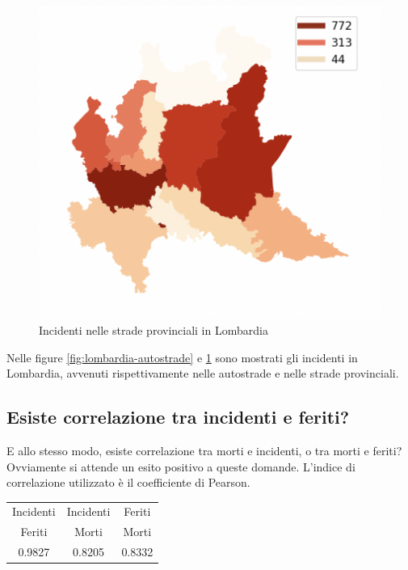 \documentclass[a4paper]{report}
\begin{document}
\begin{figure}
    \includegraphics[width=\linewidth]{../src/provincia/lombardia_strade_prov.png}
    \caption{Incidenti nelle strade provinciali in Lombardia}
    \label{fig:lombardia-strade-prov}
\end{figure}

Nelle figure \ref{fig:lombardia-autostrade} e \ref{fig:lombardia-strade-prov} sono mostrati gli incidenti in Lombardia, 
avvenuti rispettivamente nelle autostrade e nelle strade provinciali.



\subsection{Esiste correlazione tra incidenti e feriti?}

E allo stesso modo, esiste correlazione tra morti e incidenti, o tra morti e feriti?\\
Ovviamente si attende un esito positivo a queste domande.
L'indice di correlazione utilizzato è il coefficiente di Pearson.

\begin{center}
    \def\arraystretch{1.5}%
    \begin{tabular}{ |c|c|c| } 
    \hline
    Incidenti & Incidenti & Feriti \\ 
    Feriti & Morti & Morti \\ 
    \hline
    0.9827 & 0.8205 & 0.8332 \\ 
    \hline
    \end{tabular}
\end{center}
\end{document}
